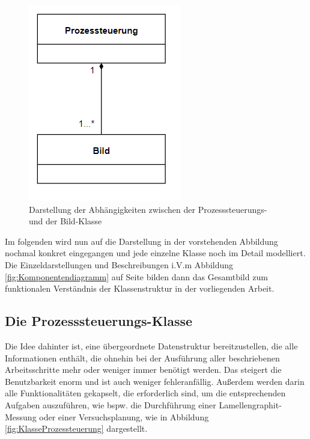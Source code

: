 \documentclass[
fontsize=10pt, 
listof = totoc,
parskip = half	
]{report}
\begin{document}
\begin{figure}[H]
	\centering
	\includegraphics[scale=0.8]{pics/class_diagram_overview}
	\caption{Darstellung der Abhängigkeiten zwischen der Prozesssteuerungs- und der Bild-Klasse}
	\label{fig:KlassendiagrammUeberblick}
\end{figure}

\noindent Im folgenden wird nun auf die Darstellung in der vorstehenden Abbildung nochmal konkret eingegangen und jede einzelne Klasse noch im Detail modelliert. Die Einzeldarstellungen und Beschreibungen i.V.m Abbildung \ref{fig:Komponentendiagramm} auf Seite \pageref{fig:Komponentendiagramm} bilden dann das Gesamtbild zum funktionalen Verständnis der Klassenstruktur in der vorliegenden Arbeit.


\subsection{Die Prozesssteuerungs-Klasse}

Die Idee dahinter ist, eine übergeordnete Datenstruktur bereitzustellen, die alle Informationen enthält, die ohnehin bei der Ausführung aller beschriebenen Arbeitsschritte mehr oder weniger immer benötigt werden. Das steigert die Benutzbarkeit enorm und ist auch weniger fehleranfällig. Außerdem werden darin alle Funktionalitäten gekapselt, die erforderlich sind, um die entsprechenden Aufgaben auszuführen, wie bspw. die Durchführung einer Lamellengraphit-Messung oder einer Versuchsplanung, wie in Abbildung \ref{fig:KlasseProzessteuerung} dargestellt.
\end{document}
